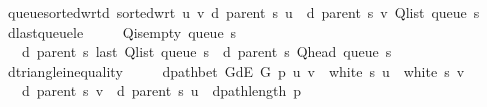 \begin{isabellebody}
\ \ \ queue{\isacharunderscore}{\kern0pt}sorted{\isacharunderscore}{\kern0pt}wrt{\isacharunderscore}{\kern0pt}d{\isacharcolon}{\kern0pt}\ {\isachardoublequoteopen}sorted{\isacharunderscore}{\kern0pt}wrt\ {\isacharparenleft}{\kern0pt}{\isasymlambda}u\ v{\isachardot}{\kern0pt}\ d\ {\isacharparenleft}{\kern0pt}parent\ s{\isacharparenright}{\kern0pt}\ u\ {\isasymle}\ d\ {\isacharparenleft}{\kern0pt}parent\ s{\isacharparenright}{\kern0pt}\ v{\isacharparenright}{\kern0pt}\ {\isacharparenleft}{\kern0pt}Q{\isacharunderscore}{\kern0pt}list\ {\isacharparenleft}{\kern0pt}queue\ s{\isacharparenright}{\kern0pt}{\isacharparenright}{\kern0pt}{\isachardoublequoteclose}\isanewline
\ \ \ d{\isacharunderscore}{\kern0pt}last{\isacharunderscore}{\kern0pt}queue{\isacharunderscore}{\kern0pt}le{\isacharcolon}{\kern0pt}\isanewline
\ \ \ \ {\isachardoublequoteopen}{\isasymnot}\ Q{\isacharunderscore}{\kern0pt}is{\isacharunderscore}{\kern0pt}empty\ {\isacharparenleft}{\kern0pt}queue\ s{\isacharparenright}{\kern0pt}\ {\isasymLongrightarrow}\isanewline
\ \ \ \ \ d\ {\isacharparenleft}{\kern0pt}parent\ s{\isacharparenright}{\kern0pt}\ {\isacharparenleft}{\kern0pt}last\ {\isacharparenleft}{\kern0pt}Q{\isacharunderscore}{\kern0pt}list\ {\isacharparenleft}{\kern0pt}queue\ s{\isacharparenright}{\kern0pt}{\isacharparenright}{\kern0pt}{\isacharparenright}{\kern0pt}\ {\isasymle}\ d\ {\isacharparenleft}{\kern0pt}parent\ s{\isacharparenright}{\kern0pt}\ {\isacharparenleft}{\kern0pt}Q{\isacharunderscore}{\kern0pt}head\ {\isacharparenleft}{\kern0pt}queue\ s{\isacharparenright}{\kern0pt}{\isacharparenright}{\kern0pt}\ {\isacharplus}{\kern0pt}\ {}{\isachardoublequoteclose}\isanewline
\ \ \ d{\isacharunderscore}{\kern0pt}triangle{\isacharunderscore}{\kern0pt}inequality{\isacharcolon}{\kern0pt}\isanewline
\ \ \ \ {\isachardoublequoteopen}{\isasymlbrakk}\ dpath{\isacharunderscore}{\kern0pt}bet\ {\isacharparenleft}{\kern0pt}G{\isachardot}{\kern0pt}dE\ G{\isacharparenright}{\kern0pt}\ p\ u\ v{\isacharsemicolon}{\kern0pt}\ {\isasymnot}\ white\ s\ u{\isacharsemicolon}{\kern0pt}\ {\isasymnot}\ white\ s\ v\ {\isasymrbrakk}\ {\isasymLongrightarrow}\isanewline
\ \ \ \ \ d\ {\isacharparenleft}{\kern0pt}parent\ s{\isacharparenright}{\kern0pt}\ v\ {\isasymle}\ d\ {\isacharparenleft}{\kern0pt}parent\ s{\isacharparenright}{\kern0pt}\ u\ {\isacharplus}{\kern0pt}\ dpath{\isacharunderscore}{\kern0pt}length\ p{\isachardoublequoteclose}%
\begin{isamarkuptext}%

\end{isamarkuptext}
\end{isabellebody}
